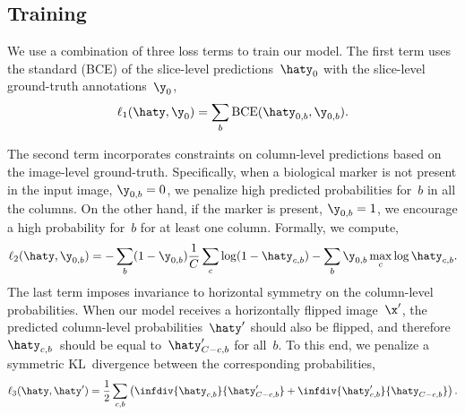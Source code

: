 \subsection{Training}

We use a combination of three loss terms to train our model. The first term uses the standard  (BCE) of the slice-level predictions~$\haty_0$ with the slice-level ground-truth annotations~$\y_0$,
\begin{equation}
    \ell_1(\haty, \y_0) = \sum_{b} \textrm{BCE}(\haty_{0,b}, \y_{0,b}).
    \label{eq:l1}
\end{equation}

The second term incorporates constraints on column-level predictions based on the image-level ground-truth. Specifically, when a biological marker is not present in the input image, $\y_{0,b} = 0$, we penalize high predicted probabilities for~$b$ in all the columns. On the other hand, if the marker is present, $\y_{0,b}=1$, we encourage a high probability for~$b$ for at least one column. Formally, we compute,
\begin{equation}
    \ell_2(\haty, \y_{0,b}) = -\sum_b (1-\y_{0,b})\dfrac{1}{C}\sum_c \log (1-\haty_{c,b}) - \sum_b \y_{0,b}\max_c \log \haty_{c,b}.
    \label{eq:l2}
\end{equation}
The last term imposes invariance to horizontal symmetry on the column-level probabilities. When our model receives a horizontally flipped image~$\x'$, the predicted column-level probabilities~$\haty'$ should also be flipped, and therefore $\haty_{c,b}$~should be equal to~$\haty'_{C-c,b}$ for all~$b$. To this end, we penalize a symmetric KL~divergence between the corresponding probabilities,
\begin{equation}
    \ell_3(\haty, \haty') = \dfrac{1}{2}\sum_{c, b} 
        \left(
            \infdiv{\haty_{c, b}}{{\haty'_{C-c, b}}} +
            \infdiv{\haty'_{c, b}}{{\haty_{C-c, b}}}
        \right).
\end{equation}

